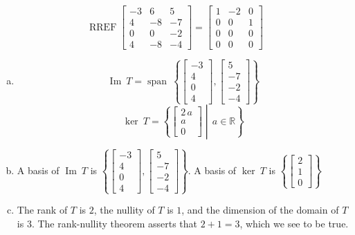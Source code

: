 \begin{exerciseAnswer} 


\[\operatorname{RREF} \left[\begin{array}{ccc}
-3 & 6 & 5 \\
4 & -8 & -7 \\
0 & 0 & -2 \\
4 & -8 & -4
\end{array}\right] = \left[\begin{array}{ccc}
1 & -2 & 0 \\
0 & 0 & 1 \\
0 & 0 & 0 \\
0 & 0 & 0
\end{array}\right] \]


\begin{enumerate}[(a)]
\item \[\operatorname{Im}\ T = \operatorname{span}\  \left\{ \left[\begin{array}{c}
-3 \\
4 \\
0 \\
4
\end{array}\right] , \left[\begin{array}{c}
5 \\
-7 \\
-2 \\
-4
\end{array}\right] \right\} \]\[\operatorname{ker}\ T =  \left\{ \left[\begin{array}{c}
2 \, a \\
a \\
0
\end{array}\right] \middle|\,a\in\mathbb{R}\right\} \]
\item  A basis of \(\operatorname{Im}\ T\) is \( \left\{ \left[\begin{array}{c}
-3 \\
4 \\
0 \\
4
\end{array}\right] , \left[\begin{array}{c}
5 \\
-7 \\
-2 \\
-4
\end{array}\right] \right\} \). A basis of \(\operatorname{ker}\ T\) is \( \left\{ \left[\begin{array}{c}
2 \\
1 \\
0
\end{array}\right] \right\} \)
\item  The rank of \(T\) is \( 2 \), the nullity of \(T\) is \( 1 \), and the dimension of the domain of \(T\) is \( 3 \). The rank-nullity theorem asserts that \( 2 + 1 = 3 \), which we see to be true. 
\end{enumerate}
    
\end{exerciseAnswer}
    
